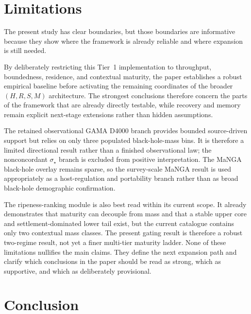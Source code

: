 \documentclass[11pt]{article}
\begin{document}
\section{Limitations}

The present study has clear boundaries, but those boundaries are informative because they show where the framework is already reliable and where expansion is still needed.

By deliberately restricting this Tier~1 implementation to throughput, boundedness, residence, and contextual maturity, the paper establishes a robust empirical baseline before activating the remaining coordinates of the broader $(H,R,S,M)$ architecture. The strongest conclusions therefore concern the parts of the framework that are already directly testable, while recovery and memory remain explicit next-stage extensions rather than hidden assumptions.

The retained observational GAMA D4000 branch provides bounded source-driven support but relies on only three populated black-hole-mass bins. It is therefore a limited directional result rather than a finished observational law; the nonconcordant $\sigma_\star$ branch is excluded from positive interpretation. The MaNGA black-hole overlay remains sparse, so the survey-scale MaNGA result is used appropriately as a host-regulation and portability branch rather than as broad black-hole demographic confirmation.

The ripeness-ranking module is also best read within its current scope. It already demonstrates that maturity can decouple from mass and that a stable upper core and settlement-dominated lower tail exist, but the current catalogue contains only two contextual mass classes. The present gating result is therefore a robust two-regime result, not yet a finer multi-tier maturity ladder. None of these limitations nullifies the main claims. They define the next expansion path and clarify which conclusions in the paper should be read as strong, which as supportive, and which as deliberately provisional.

\section{Conclusion}
\end{document}
